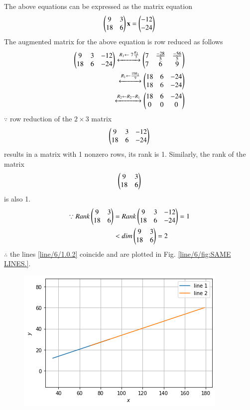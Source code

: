 \begin{enumerate}
The above equations can be expressed as the matrix equation
\begin{align}
\begin{pmatrix}9 & 3\\18 & 6\end{pmatrix} \mathbf{x} = \begin{pmatrix}-12\\-24\end{pmatrix}
\end{align}
%
The augmented matrix for the above equation is row reduced as follows
\begin{align}
\begin{pmatrix}9 & 3 & -12\\18 & 6 & -24 \end{pmatrix} 
\xleftrightarrow {R_1\leftarrow \ 7\frac{R_1}{5}}\begin{pmatrix}7 & \frac{-28}{5} & \frac{-56}{5}\\7 & 6 & 9\end{pmatrix} 
\\
\xleftrightarrow {R_1\leftarrow \frac{18R_1}{9}}\begin{pmatrix}18 & 6 & -24 \\18 & 6 & -24\end{pmatrix}
\\
\xleftrightarrow {R_2\leftarrow R_2-R_1}\begin{pmatrix}18 & 6 & -24 \\0 & 0 & 0\end{pmatrix}
\end{align}
%
$\because$ row reduction of the $2\times 3$ matrix
%
\begin{align}
\begin{pmatrix}9 & 3 & -12\\18 & 6 & -24\end{pmatrix}
\end{align}
%
results in a matrix with 1 nonzero rows, its rank is 1. 
%
Similarly, the rank of the matrix 
\begin{align}
\begin{pmatrix}9 & 3 \\18 & 6 \end{pmatrix} 
\end{align}
%
is also 1.
%
\begin{align}
\because Rank \begin{pmatrix}9 & 3\\18 & 6\end{pmatrix} &= Rank\begin{pmatrix}9 & 3 & -12\\18 & 6 & -24\end{pmatrix}=1\nonumber\\
&< dim\begin{pmatrix}9 & 3\\18 & 6\end{pmatrix}=2
\end{align}
%
$\therefore$ the lines \eqref{line/6/1.0.2} coincide and are plotted in Fig. \ref{line/6/fig:SAME LINES.}.
%
\begin{figure}[ht!]
    \centering
    \includegraphics[width=\columnwidth]{solutions/su2021/2/6/FIGURES/SAME_LINES.png}

\end{figure}
\end{enumerate}
